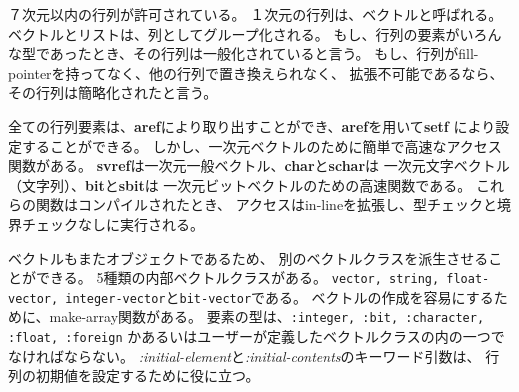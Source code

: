 ７次元以内の行列が許可されている。
１次元の行列は、ベクトルと呼ばれる。
ベクトルとリストは、列としてグループ化される。
もし、行列の要素がいろんな型であったとき、その行列は一般化されていると言う。
もし、行列がfill-pointerを持ってなく、他の行列で置き換えられなく、
拡張不可能であるなら、その行列は簡略化されたと言う。

全ての行列要素は、{\bf aref}により取り出すことができ、{\bf aref}を用いて{\bf setf}
により設定することができる。
しかし、一次元ベクトルのために簡単で高速なアクセス関数がある。
{\bf svref}は一次元一般ベクトル、{\bf char}と{\bf schar}は
一次元文字ベクトル（文字列）、{\bf bit}と{\bf sbit}は
一次元ビットベクトルのための高速関数である。
これらの関数はコンパイルされたとき、
アクセスはin-lineを拡張し、型チェックと境界チェックなしに実行される。

ベクトルもまたオブジェクトであるため、
別のベクトルクラスを派生させることができる。
5種類の内部ベクトルクラスがある。
{\tt vector, string, float-vector, integer-vector}と{\tt bit-vector}である。
ベクトルの作成を容易にするために、make-array関数がある。
要素の型は、{\tt :integer, :bit, :character, :float, :foreign}
かあるいはユーザーが定義したベクトルクラスの内の一つでなければならない。
{\em :initial-element}と{\em :initial-contents}のキーワード引数は、
行列の初期値を設定するために役に立つ。

